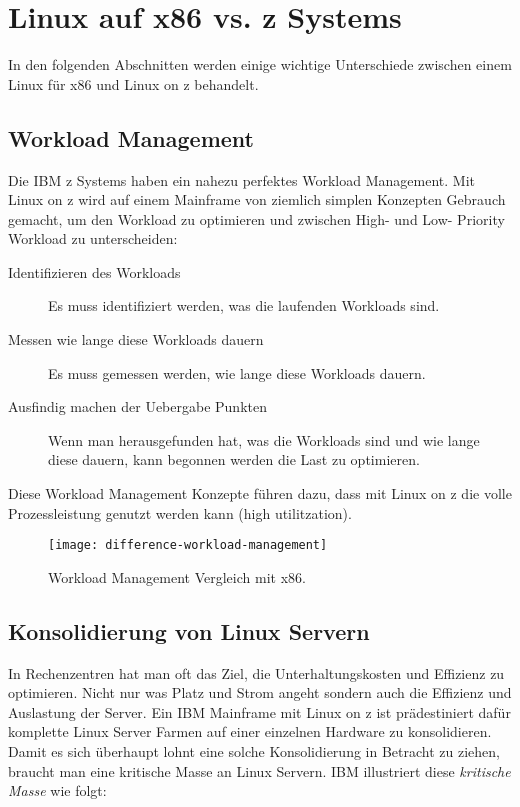 \chapter{Linux auf x86 vs. z Systems}
\label{cha:Unterschiede}

In den folgenden Abschnitten werden einige wichtige Unterschiede zwischen einem Linux für x86 und Linux on z behandelt.

\section{Workload Management}
\label{sec:WorkloadManagement}

Die IBM z Systems haben ein nahezu perfektes Workload Management.
Mit Linux on z wird auf einem Mainframe von ziemlich simplen Konzepten Gebrauch gemacht, um den Workload zu optimieren
und zwischen High- und Low- Priority Workload zu unterscheiden:\cite{IBMRedBookWorkloadConcept}

\begin{description}
    \item[Identifizieren des Workloads]{Es muss identifiziert werden, was die laufenden Workloads sind.}
    \item[Messen wie lange diese Workloads dauern]{Es muss gemessen werden, wie lange diese Workloads dauern.}
    \item[Ausfindig machen der Uebergabe Punkten]{Wenn man herausgefunden hat, was die Workloads sind und wie lange diese dauern, kann begonnen werden die Last zu optimieren.}
\end{description}

\newpage
Diese Workload Management Konzepte führen dazu, dass mit Linux on z die volle Prozessleistung genutzt werden kann (high utilitzation).

\begin{figure}[h!]
\centering
\texttt{[image: difference-workload-management]}
\caption{Workload Management Vergleich mit x86\cite{WorkloadManagement}.}
\label{fig:WorkloadManagement}
\end{figure}

\section{Konsolidierung von Linux Servern}
\label{sec:Konsolidierung}

In Rechenzentren hat man oft das Ziel, die Unterhaltungskosten und Effizienz zu optimieren.
Nicht nur was Platz und Strom angeht sondern auch die Effizienz und Auslastung der Server.
Ein IBM Mainframe mit Linux on z ist prädestiniert dafür komplette Linux Server Farmen auf einer
einzelnen Hardware zu konsolidieren.
Damit es sich überhaupt lohnt eine solche Konsolidierung in Betracht zu ziehen, braucht man eine kritische Masse
an Linux Servern. IBM illustriert diese \textit{kritische Masse} wie folgt:

